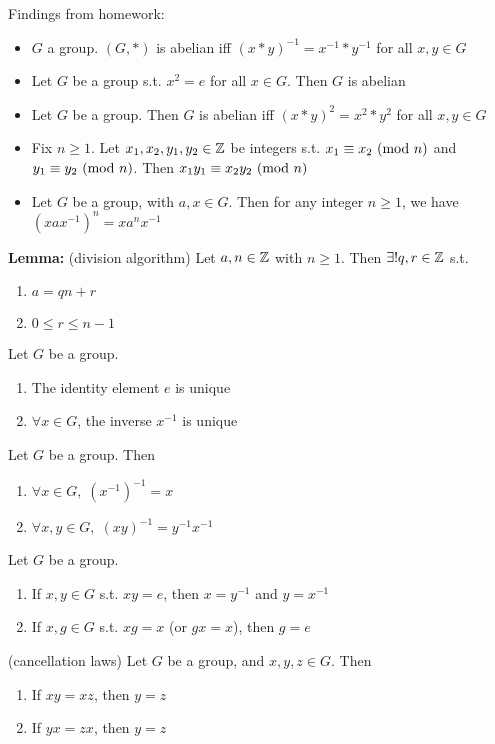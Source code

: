 Findings from homework:
\begin{itemize}
    \item $G$ a group. $(G, \ast)$ is abelian iff $(x \ast y)^{-1} = x^{-1} \ast y^{-1} $ for all $x, y \in G$
    \item Let $G$ be a group s.t. $x^2 = e$ for all $x \in G$. Then $G$ is abelian
    \item Let $G$ be a group. Then $G$ is abelian iff $(x \ast y)^2 = x^2 \ast y^2 $ for all $x, y \in G$
    \item Fix $n \ge 1$. Let $x_1, x_2, y_1, y_2 \in \mathbb{Z}$ be integers s.t. $x_1 \equiv x_2 \text{ (mod } n)$ and $y_1 \equiv y_2 \text{ (mod } n)$. Then $x_1y_1 \equiv x_2y_2 \text{ (mod } n)$
    \item Let $G$ be a group, with $a, x \in G$. Then for any integer $n \ge 1$, we have \\ $(xax^{-1})^n = xa^nx^{-1}$ 
\end{itemize}

\bigskip

\noindent
\textbf{Lemma:} (division algorithm) Let $a, n \in \mathbb{Z}$ with $ n \ge 1$. Then $\exists ! q, r \in \mathbb{Z}$ s.t.
\begin{enumerate}
    \item $a = qn + r$
    \item $0 \le r \le n - 1$
\end{enumerate}

\prop Let $G$ be a group.
\begin{enumerate}
    \item The identity element $e$ is unique
    \item $\forall x \in G$, the inverse $x^{-1}$ is unique
\end{enumerate}

\prop Let $G$ be a group. Then 
\begin{enumerate}
    \item $\forall x \in G,\; (x^{-1})^{-1} = x$
    \item $\forall x, y \in G, \; (xy)^{-1}=y^{-1}x^{-1}$
\end{enumerate}

\prop Let $G$ be a group. 
\begin{enumerate}
    \item If $x, y \in G$ s.t. $xy = e$, then $x=y^{-1}$ and $y=x^{-1}$
    \item If $x, g \in G$ s.t. $xg = x$ (or $gx = x$), then $g = e$
\end{enumerate}

\prop (cancellation laws) Let $G$ be a group, and $x, y, z \in G$. Then 
\begin{enumerate}
    \item If $xy = xz$, then $y = z$
    \item If $yx = zx$, then $y = z$
\end{enumerate}


